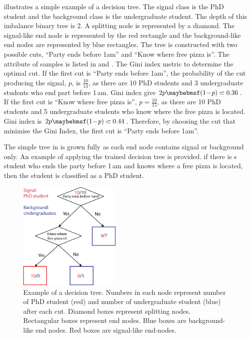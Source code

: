  illustrates a simple example of a decision tree. The signal class is the PhD student and the background class is the undergraduate student. The depth of this imbalance binary  tree is 2. A splitting node is represented by a diamond.  The signal-like end node is represented by the red rectangle and the background-like end nodes are represented by blue rectangles. The tree is constructed with two possible cuts, ``Party ends before 1am'' and ``Know where free pizza is''. The attribute of samples is listed in  and  . The Gini index metric to determine the optimal cut. If the first cut is ``Party ends before 1am'', the probability of the cut producing the signal, $p$, is $\frac{10}{13}$, as there are 10 PhD students and 3 undergraduate students who end part before 1\,am. Gini index give $2p\parenths{1\!-\!p} \backsimeq 0.36 $. If the first cut is ``Know where free pizza is'', $p=\frac{10}{15}$, as there are  10 PhD students and 5 undergraduate students who know where the free pizza is located. Gini index is $2p\parenths{1\!-\!p} \backsimeq 0.44 $. Therefore, by choosing the cut that minimise the Gini Index, the first cut is ``Party ends before 1am''.

The simple tree in  is grown fully as each end node contains signal or background only. An example of applying the trained decision tree is provided. if there is s student who ends the party before 1\,am and knows where a free pizza is located, then the student is classified as a PhD student.

\begin{figure}[!tbp]
\includegraphics[width=0.45\textwidth]{doubleHiggs/mva/BDTcomic}
\caption[Example of a decision tree. ]
{Example of a decision tree. Numbers in each node represent number of PhD student (red) and number of undergraduate student (blue) after each cut. Diamond boxes represent splitting nodes. Rectangular boxes represent end nodes. Blue boxes are background-like end nodes. Red boxes are signal-like end-nodes.}
   \label{fig:doubleHiggsMVAdecisionTree}
\end{figure}

